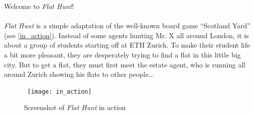 Welcome to \emph{Flat Hunt}!

\paragraph{}
\emph{Flat Hunt} is a simple adaptation of the well-known board game ``Scotland Yard'' (see \autoref{in_action}). Instead of some agents hunting Mr. X all around London, it is about a group of students starting off at ETH Zurich. To make their student life a bit more pleasant, they are desperately trying to find a flat in this little big city. But to get a flat, they must first meet the estate agent, who is running all around Zurich showing his flats to other people\ldots

\begin{figure}[h]
  \centerline{\hbox{
    \texttt{[image: in\_action]}
  }}
\caption{Screenshot of \emph{Flat Hunt} in action}
\label{in_action}
\end{figure}
